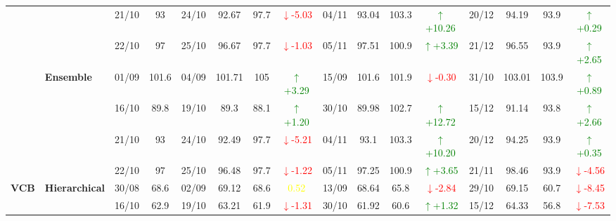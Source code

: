 \documentclass{ieeeaccess}
\begin{document}
{\begin{longtable}{llcc|cccc|cccc|cccc}
&
& 21/10 & 93 & 24/10 & 92.67 & 97.7 & \textcolor{red}{\(\downarrow\)-5.03} & 04/11 & 93.04 & 103.3 & \textcolor{green}{\(\uparrow\)+10.26} & 20/12 & 94.19 & 93.9 & \textcolor{green}{\(\uparrow\)+0.29} \\

&
& 22/10 & 97 & 25/10 & 96.67 & 97.7 & \textcolor{red}{\(\downarrow\)-1.03} & 05/11 & 97.51 & 100.9 & \textcolor{green}{\(\uparrow\)+3.39} & 21/12 & 96.55 & 93.9 & \textcolor{green}{\(\uparrow\)+2.65} \\
\cmidrule(lr){2-16}



& \textbf{Ensemble}
& 01/09 & 101.6 & 04/09 & 101.71 & 105 & \textcolor{green}{\(\uparrow\)+3.29} & 15/09 & 101.6 & 101.9 & \textcolor{red}{\(\downarrow\)-0.30} & 31/10 & 103.01 & 103.9 & \textcolor{green}{\(\uparrow\)+0.89} \\

&
& 16/10 & 89.8 & 19/10 & 89.3 & 88.1 & \textcolor{green}{\(\uparrow\)+1.20} & 30/10 & 89.98 & 102.7 & \textcolor{green}{\(\uparrow\)+12.72} & 15/12 & 91.14 & 93.8 & \textcolor{green}{\(\uparrow\)+2.66} \\

&
& 21/10 & 93 & 24/10 & 92.49 & 97.7 & \textcolor{red}{\(\downarrow\)-5.21} & 04/11 & 93.1 & 103.3 & \textcolor{green}{\(\uparrow\)+10.20} & 20/12 & 94.25 & 93.9 & \textcolor{green}{\(\uparrow\)+0.35} \\

&
& 22/10 & 97 & 25/10 & 96.48 & 97.7 & \textcolor{red}{\(\downarrow\)-1.22} & 05/11 & 97.25 & 100.9 & \textcolor{green}{\(\uparrow\)+3.65} & 21/11 & 98.46 & 93.9 & \textcolor{red}{\(\downarrow\)-4.56} \\
\midrule




\multirow{12}{*}{\textbf{VCB}} 
& \textbf{Hierarchical}
& 30/08 & 68.6 & 02/09 & 69.12 & 68.6 & \textcolor{yellow}{0.52} & 13/09 & 68.64 & 65.8 & \textcolor{red}{\(\downarrow\)-2.84} & 29/10 & 69.15 & 60.7 & \textcolor{red}{\(\downarrow\)-8.45} \\

&
& 16/10 & 62.9 & 19/10 & 63.21 & 61.9 & \textcolor{red}{\(\downarrow\)-1.31} & 30/10 & 61.92 & 60.6 & \textcolor{green}{\(\uparrow\)+1.32} & 15/12 & 64.33 & 56.8 & \textcolor{red}{\(\downarrow\)-7.53} \\


\end{longtable}}
\end{document}
